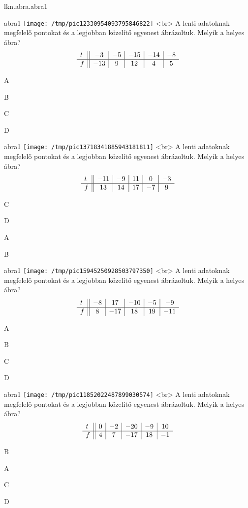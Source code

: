 \documentclass[12pt]{article}
\begin{document}
\begin{quiz}{lkn.abra.abra1}
\begin{multi}{abra1}
\texttt{[image: /tmp/pic12330954093795846822]}
<br>
A lenti adatoknak megfelelő pontokat és a 
legjobban közelítő egyenest ábrázoltuk. Melyik a helyes ábra?
$$\begin{array}{l ||c|c|c|c|c}t&-3&-5&-15&-14&-8\\ \hline f&-13&9&12&4&5 \\ \end{array}$$
  \item* A
    \item  B
    \item  C
    \item  D
    \end{multi}
    

\begin{multi}{abra1}
\texttt{[image: /tmp/pic13718341885943181811]}
<br>
A lenti adatoknak megfelelő pontokat és a 
legjobban közelítő egyenest ábrázoltuk. Melyik a helyes ábra?
$$\begin{array}{l ||c|c|c|c|c}t&-11&-9&11&0&-3\\ \hline f&13&14&17&-7&9 \\ \end{array}$$
  \item* C
    \item  D
    \item  A
    \item  B
    \end{multi}
    

\begin{multi}{abra1}
\texttt{[image: /tmp/pic15945250928503797350]}
<br>
A lenti adatoknak megfelelő pontokat és a 
legjobban közelítő egyenest ábrázoltuk. Melyik a helyes ábra?
$$\begin{array}{l ||c|c|c|c|c}t&-8&17&-10&-5&-9\\ \hline f&8&-17&18&19&-11 \\ \end{array}$$
  \item* A
    \item  B
    \item  C
    \item  D
    \end{multi}
    

\begin{multi}{abra1}
\texttt{[image: /tmp/pic11852022487899030574]}
<br>
A lenti adatoknak megfelelő pontokat és a 
legjobban közelítő egyenest ábrázoltuk. Melyik a helyes ábra?
$$\begin{array}{l ||c|c|c|c|c}t&0&-2&-20&-9&10\\ \hline f&4&7&-17&18&-1 \\ \end{array}$$
  \item* B
    \item  A
    \item  C
    \item  D
    \end{multi}
    


\end{quiz}
\end{document}

